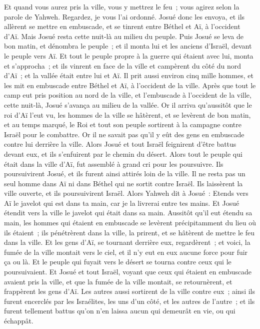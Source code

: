 \begin{multicols}{2}
Et quand vous aurez pris la ville, vous y mettrez le feu~; vous agirez selon la parole de Yahweh. Regardez, je vous l'ai ordonné.
Josué donc les envoya, et ils allèrent se mettre en embuscade, et se tinrent entre Béthel et Aï, à l'occident d'Aï. Mais Josué resta cette nuit-là au milieu du peuple.
Puis Josué se leva de bon matin, et dénombra le peuple~; et il monta lui et les anciens d'Israël, devant le peuple vers Aï.
Et tout le peuple propre à la guerre qui étaient avec lui, monta et s'approcha~; et ils vinrent en face de la ville et campèrent du côté du nord d'Aï~; et la vallée était entre lui et Aï.
Il prit aussi environ cinq mille hommes, et les mit en embuscade entre Béthel et Aï, à l'occident de la ville.
Après que tout le camp eut pris position au nord de la ville, et l'embuscade à l'occident de la ville, cette nuit-là, Josué s'avança au milieu de la vallée.
Or il arriva qu'aussitôt que le roi d'Aï l'eut vu, les hommes de la ville se hâtèrent, et se levèrent de bon matin, et au temps marqué, le Roi et tout son peuple sortirent à la campagne contre Israël pour le combattre. Or il ne savait pas qu'il y eût des gens en embuscade contre lui derrière la ville.
Alors Josué et tout Israël feignirent d'être battus devant eux, et ils s'enfuirent par le chemin du désert.
Alors tout le peuple qui était dans la ville d'Aï, fut assemblé à grand cri pour les poursuivre. Ils poursuivirent Josué, et ils furent ainsi attirés loin de la ville.
Il ne resta pas un seul homme dans Aï ni dans Béthel qui ne sortit contre Israël. Ils laissèrent la ville ouverte, et ils poursuivirent Israël.
Alors Yahweh dit à Josué~: Etends vers Aï le javelot qui est dans ta main, car je la livrerai entre tes mains. Et Josué étendit vers la ville le javelot qui était dans sa main.
Aussitôt qu'il eut étendu sa main, les hommes qui étaient en embuscade se levèrent précipitamment du lieu où ils étaient~; ils pénétrèrent dans la ville, la prirent, et se hâtèrent de mettre le feu dans la ville.
Et les gens d'Aï, se tournant derrière eux, regardèrent~; et voici, la fumée de la ville montait vers le ciel, et il n'y eut en eux aucune force pour fuir ça ou là. Et le peuple qui fuyait vers le désert se tourna contre ceux qui le poursuivaient.
Et Josué et tout Israël, voyant que ceux qui étaient en embuscade avaient pris la ville, et que la fumée de la ville montait, se retournèrent, et frappèrent les gens d'Aï.
Les autres aussi sortirent de la ville contre eux~; ainsi ils furent encerclés par les Israélites, les uns d'un côté, et les autres de l'autre~; et ils furent tellement battus qu'on n'en laissa aucun qui demeurât en vie, ou qui échappât.

\end{multicols}
